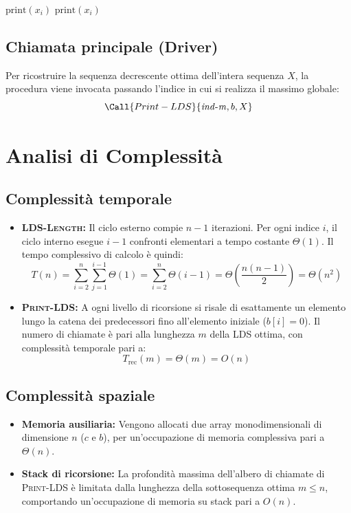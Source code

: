 \begin{algorithm}[H]
\caption{Ricostruzione e stampa della sottosequenza ottima}
\label{alg:print-lds}
\begin{algorithmic}[1]
 
\State $\text{print}(x_i)$
\Else
\State {} 
\State $\text{print}(x_i)$ 
\EndIf
\EndProcedure
\end{algorithmic}
\end{algorithm}\subsection{Chiamata principale (Driver)}
Per ricostruire la sequenza decrescente ottima dell'intera sequenza $X$, la procedura viene invocata passando l'indice in cui si realizza il massimo globale:
\begin{equation*}
\Call{Print-LDS}{\mathit{ind\text{-}m}, b, X}
\end{equation*}\section{Analisi di Complessità}\subsection{Complessità temporale}
\begin{itemize}
\item \textbf{\textsc{LDS-Length}:} Il ciclo esterno compie $n-1$ iterazioni. Per ogni indice $i$, il ciclo interno esegue $i-1$ confronti elementari a tempo costante $\Theta(1)$. Il tempo complessivo di calcolo è quindi:
\begin{equation*}
T(n) = \sum_{i=2}^{n} \sum_{j=1}^{i-1} \Theta(1) = \sum_{i=2}^{n} \Theta(i-1) = \Theta\left(\frac{n(n-1)}{2}\right) = \Theta(n^2)
\end{equation*}
\item \textbf{\textsc{Print-LDS}:} A ogni livello di ricorsione si risale di esattamente un elemento lungo la catena dei predecessori fino all'elemento iniziale ($b[i] = 0$). Il numero di chiamate è pari alla lunghezza $m$ della LDS ottima, con complessità temporale pari a:
\begin{equation*}
T_{\text{rec}}(m) = \Theta(m) = O(n)
\end{equation*}
\end{itemize}\subsection{Complessità spaziale}
\begin{itemize}
\item \textbf{Memoria ausiliaria:} Vengono allocati due array monodimensionali di dimensione $n$ ($c$ e $b$), per un'occupazione di memoria complessiva pari a $\Theta(n)$.
\item \textbf{Stack di ricorsione:} La profondità massima dell'albero di chiamate di \textsc{Print-LDS} è limitata dalla lunghezza della sottosequenza ottima $m \le n$, comportando un'occupazione di memoria su stack pari a $O(n)$.
\end{itemize}